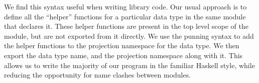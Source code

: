 
We find this syntax useful when writing library code. Our usual approach is to define all the ``helper'' functions for a particular data type in the same module that declares it. These helper functions are present in the top level scope of the module, but are not exported from it directly. We use the punning syntax to add the helper functions to the projection namespace for the data type. We then export the data type name, and the projection namespace along with it. This allows us to write the majority of our program in the familiar Haskell style, while reducing the opportunity for name clashes between modules.
	
